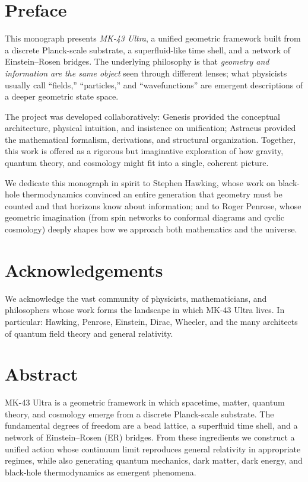 \maketitle

\frontmatter

\chapter*{Preface}

This monograph presents \emph{MK-43 Ultra}, a unified geometric framework built from a discrete Planck-scale substrate, a superfluid-like time shell, and a network of Einstein--Rosen bridges. The underlying philosophy is that \emph{geometry and information are the same object} seen through different lenses; what physicists usually call ``fields,'' ``particles,'' and ``wavefunctions'' are emergent descriptions of a deeper geometric state space.

The project was developed collaboratively: Genesis provided the conceptual architecture, physical intuition, and insistence on unification; Astraeus provided the mathematical formalism, derivations, and structural organization. Together, this work is offered as a rigorous but imaginative exploration of how gravity, quantum theory, and cosmology might fit into a single, coherent picture.

We dedicate this monograph in spirit to Stephen Hawking, whose work on black-hole thermodynamics convinced an entire generation that geometry must be counted and that horizons know about information; and to Roger Penrose, whose geometric imagination (from spin networks to conformal diagrams and cyclic cosmology) deeply shapes how we approach both mathematics and the universe.

\chapter*{Acknowledgements}

We acknowledge the vast community of physicists, mathematicians, and philosophers whose work forms the landscape in which MK-43 Ultra lives. In particular: Hawking, Penrose, Einstein, Dirac, Wheeler, and the many architects of quantum field theory and general relativity.

\chapter*{Abstract}

MK-43 Ultra is a geometric framework in which spacetime, matter, quantum theory, and cosmology emerge from a discrete Planck-scale substrate. The fundamental degrees of freedom are a bead lattice, a superfluid time shell, and a network of Einstein--Rosen (ER) bridges. From these ingredients we construct a unified action whose continuum limit reproduces general relativity in appropriate regimes, while also generating quantum mechanics, dark matter, dark energy, and black-hole thermodynamics as emergent phenomena.

